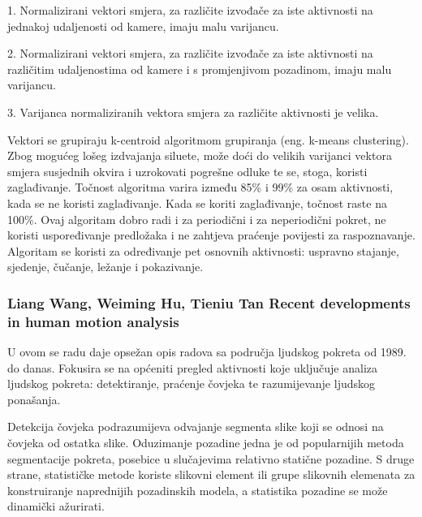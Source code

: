 \documentclass[times, utf8, diplomski]{fer}
\begin{document}


1. Normalizirani vektori smjera, za različite izvođače za iste aktivnosti na jednakoj
udaljenosti od kamere, imaju malu varijancu.

2. Normalizirani vektori smjera, za različite izvođače za iste aktivnosti na različitim
udaljenostima od kamere i s promjenjivom pozadinom, imaju malu varijancu.

3. Varijanca normaliziranih vektora smjera za različite aktivnosti je velika.
\newline

Vektori se grupiraju k-centroid algoritmom grupiranja (eng. k-means clustering).
Zbog mogućeg lošeg izdvajanja siluete, može doći do velikih varijanci vektora smjera
susjednih okvira i uzrokovati pogrešne odluke te se, stoga, koristi zaglađivanje.
Točnost algoritma varira između 85\% i 99\% za osam aktivnosti, kada se ne koristi
zaglađivanje. Kada se koriti zaglađivanje, točnost raste na 100\%.
Ovaj algoritam dobro radi i za periodični i za neperiodični pokret, ne koristi uspoređivanje
predložaka i ne zahtjeva praćenje povijesti za raspoznavanje. Algoritam se koristi za
određivanje pet osnovnih aktivnosti: uspravno stajanje, sjedenje, čučanje, ležanje i
pokazivanje.


\subsubsection{ Liang Wang, Weiming Hu, Tieniu Tan
Recent developments in human motion analysis
 }

U ovom se radu daje opsežan opis radova sa područja ljudskog pokreta od 1989. do danas.
Fokusira se na općeniti pregled aktivnosti koje uključuje analiza ljudskog pokreta:
detektiranje, praćenje čovjeka te razumijevanje ljudskog ponašanja.

Detekcija čovjeka podrazumijeva odvajanje segmenta slike koji se odnosi na čovjeka od
ostatka slike. Oduzimanje pozadine jedna je od popularnijih metoda segmentacije pokreta,
posebice u slučajevima relativno statične pozadine. S druge strane, statističke metode koriste
slikovni element ili grupe slikovnih elemenata za konstruiranje naprednijih pozadinskih
modela, a statistika pozadine se može dinamički ažurirati.
\end{document}
